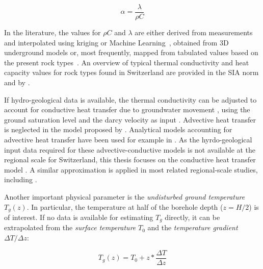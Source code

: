 \begin{equation}
\label{eq:alpha}
    \alpha = \frac{\lambda}{\rho C}
\end{equation}

In the literature, the values for $\rho C$ and $\lambda$ are either derived from measurements and interpolated using kriging \cite{tian_improved_2020,munoz_estimating_2015} or Machine Learning~\cite{assouline_machine_2019}, obtained from 3D underground models \cite{garcia-gil_gis-supported_2015,groupe_de_travail_pgg_evaluation_2011-1} or, most frequently, mapped from tabulated values based on the present rock types~\cite{perego_techno-economic_2019,galgaro_empirical_2015,casasso_g.pot:_2016,gemelli_gis-based_2011}. An overview of typical thermal conductivity and heat capacity values for rock types found in Switzerland are provided in the SIA norm \cite{sia_sondes_2010} and by \cite{pahud_geothermal_2002}.

If hydro-geological data is available, the thermal conductivity can be adjusted to account for conductive heat transfer due to groundwater movement \cite{viesi_gis-supported_2018,assouline_machine_2019}, using the ground saturation level and the darcy velocity as input \cite{viesi_gis-supported_2018}. 
Advective heat transfer is neglected in the model proposed by \citet{eskilson_thermal_1987}.
Analytical models accounting for advective heat transfer have been used for example in \cite{garcia-gil_gis-supported_2015,alcaraz_advection_2016,alcaraz_t-i-ger_2017,attard_novel_2020}.
As the hyrdo-geological input data required for these advective-conductive models is not available at the regional scale for Switzerland, this thesis focuses on the conductive heat transfer model \cite{claesson_conductive_1988}. A similar approximation is applied in most related regional-scale studies, including \cite{perego_techno-economic_2019,galgaro_empirical_2015,casasso_g.pot:_2016,rivera_increased_2017,schiel_gis-based_2016}.

Another important physical parameter is the \textit{undisturbed ground temperature} $T_g(z)$. In particular, the temperature at half of the borehole depth ($z = H/2$) is of interest. If no data is available for estimating $T_g$ directly, it can be extrapolated from the \textit{surface temperature} $T_0$ and the \textit{temperature gradient} $\Delta T/\Delta z$: 

\begin{equation}
\label{eq:Tg}
    T_g(z) = T_0 + z * \frac{\Delta T}{\Delta z}
\end{equation}

